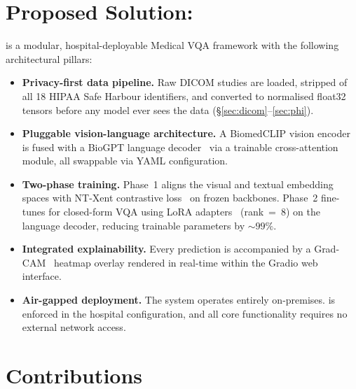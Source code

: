 \section{Proposed Solution: \medxplain}
\label{sec:solution}

\medxplain{} is a modular, hospital-deployable Medical VQA framework with
the following architectural pillars:

\begin{itemize}
  \item \textbf{Privacy-first data pipeline.} Raw DICOM studies are loaded,
        stripped of all 18 HIPAA Safe Harbour identifiers, and converted to
        normalised float32 tensors before any model ever sees the data
        (\S\ref{sec:dicom}--\ref{sec:phi}).

  \item \textbf{Pluggable vision-language architecture.} A BiomedCLIP
        vision encoder~\citep{zhang2023biomedclip} is fused with a BioGPT
        language decoder~\citep{luo2022biogpt} via a trainable
        cross-attention module, all swappable via YAML configuration.

  \item \textbf{Two-phase training.} Phase~1 aligns the visual and
        textual embedding spaces with NT-Xent contrastive
        loss~\citep{chen2020simclr} on frozen backbones. Phase~2
        fine-tunes for closed-form VQA using LoRA adapters~\citep{hu2021lora}
        (rank~=~8) on the language decoder, reducing trainable parameters
        by ${\sim}99\%$.

  \item \textbf{Integrated explainability.} Every prediction is accompanied
        by a Grad-CAM~\citep{selvaraju2017gradcam} heatmap overlay rendered
        in real-time within the Gradio web interface.

  \item \textbf{Air-gapped deployment.} The system operates entirely
        on-premises.  is enforced in the
        hospital configuration, and all core functionality requires no
        external network access.
\end{itemize}

\section{Contributions}
\label{sec:contributions}

